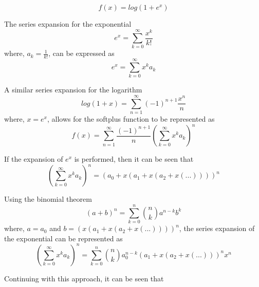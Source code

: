\begin{equation}
	f(x) = log(1+e^x)
\end{equation} 

The series expansion for the exponential
\begin{equation}
	e^x = \sum_{k=0}^\infty \frac{x^k}{k!}
\end{equation}
where, $a_k = \frac{1}{k!}$, can be expressed as
\begin{equation}
	e^x = \sum_{k=0}^\infty x^k a_k
\end{equation}

A similar series expansion for the logarithm
\begin{equation}
	log(1+x) = \sum_{n=1}^\infty (-1)^{n+1} \frac{x^n}{n}
\end{equation}
where, $x = e^x$,
allows for the softplus function to be represented as
\begin{equation}
	f(x) = \sum_{n=1}^\infty \frac{(-1)^{n+1}}{n} 				(\sum_{k=0}^\infty x^k a_k)^n
\end{equation}

If the expansion of $e^x$ is performed, then it can be seen that
\begin{equation}
	(\sum_{k=0}^\infty x^k a_k)^n = 								(a_0+x(a_1+x(a_2+x(...))))^n
\end{equation}

Using the binomial theorem
\begin{equation}
	(a+b)^n = \sum_{k=0}^{n} \binom{n}{k} a^{n-k} b^k
\end{equation}
where, $a=a_0$ and $b=(x(a_1+x(a_2+x(...))))^n$, the series expansion of the exponential can be represented as
\begin{equation}
	(\sum_{k=0}^\infty x^k a_k)^n = \sum_{k=0}^{n} 				\binom{n}{k} a_0^{n-k} (a_1+x(a_2+x(...)))^n x^n
\end{equation}

Continuing with this approach, it can be seen that 
	
